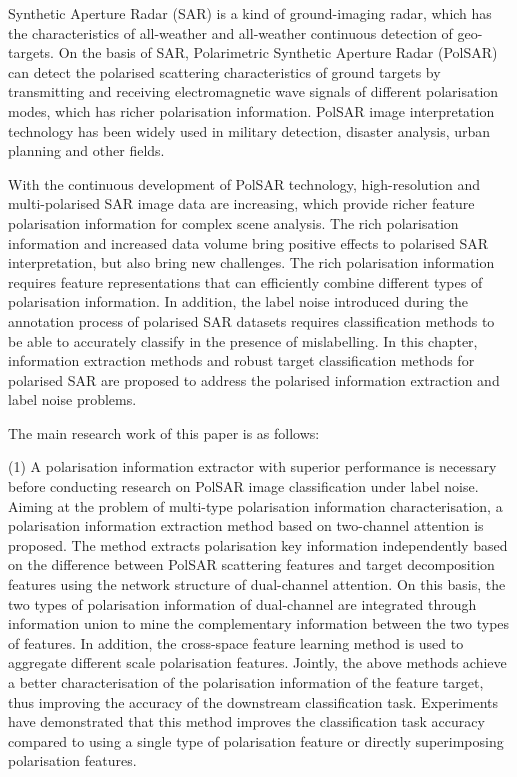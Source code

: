 
\begin{englishabstract}
    Synthetic Aperture Radar (SAR) is a kind of ground-imaging radar, which has the characteristics of all-weather and all-weather continuous detection of geo-targets. On the basis of SAR, Polarimetric Synthetic Aperture Radar (PolSAR) can detect the polarised scattering characteristics of ground targets by transmitting and receiving electromagnetic wave signals of different polarisation modes, which has richer polarisation information. PolSAR image interpretation technology has been widely used in military detection, disaster analysis, urban planning and other fields.

    With the continuous development of PolSAR technology, high-resolution and multi-polarised SAR image data are increasing, which provide richer feature polarisation information for complex scene analysis. The rich polarisation information and increased data volume bring positive effects to polarised SAR interpretation, but also bring new challenges. The rich polarisation information requires feature representations that can efficiently combine different types of polarisation information. In addition, the label noise introduced during the annotation process of polarised SAR datasets requires classification methods to be able to accurately classify in the presence of mislabelling. In this chapter, information extraction methods and robust target classification methods for polarised SAR are proposed to address the polarised information extraction and label noise problems.

    The main research work of this paper is as follows:

    (1) A polarisation information extractor with superior performance is necessary before conducting research on PolSAR image classification under label noise. Aiming at the problem of multi-type polarisation information characterisation, a polarisation information extraction method based on two-channel attention is proposed. The method extracts polarisation key information independently based on the difference between PolSAR scattering features and target decomposition features using the network structure of dual-channel attention. On this basis, the two types of polarisation information of dual-channel are integrated through information union to mine the complementary information between the two types of features. In addition, the cross-space feature learning method is used to aggregate different scale polarisation features. Jointly, the above methods achieve a better characterisation of the polarisation information of the feature target, thus improving the accuracy of the downstream classification task. Experiments have demonstrated that this method improves the classification task accuracy compared to using a single type of polarisation feature or directly superimposing polarisation features.


\end{englishabstract}
